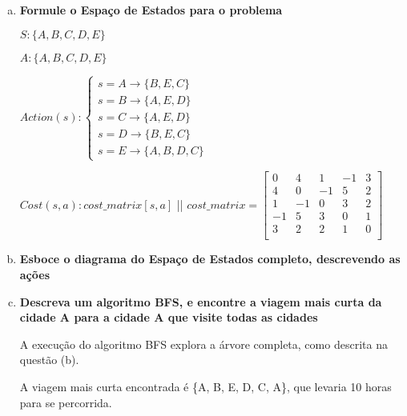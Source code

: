 \documentclass[paper=a4, fontsize=11pt]{scrartcl} %
\begin{document}
    \begin{enumerate}[(a)]
        \item \textbf{Formule o Espaço de Estados para o problema}
        \par $S: \{A, B, C, D, E\}$
        \vspace{0.2cm}

        \par $A: \{A, B, C, D, E\}$
        \vspace{0.2cm}

        \par $Action(s): \begin{cases} 
            s=A \rightarrow \{{B, E, C}\}   \\
            s=B \rightarrow \{{A, E, D}\}   \\
            s=C \rightarrow \{{A, E, D}\}   \\
            s=D \rightarrow \{{B, E, C}\}   \\
            s=E \rightarrow \{{A, B, D, C}\}
            \end{cases}$
        \vspace{0.2cm}

        \par $Cost(s, a): cost\_matrix[s,a]$  ||  $cost\_matrix=
        \begin{bmatrix}
             0 &  4 &  1 & -1 & 3 \\
             4 &  0 & -1 &  5 & 2 \\
             1 & -1 &  0 &  3 & 2 \\
            -1 &  5 &  3 &  0 & 1 \\
             3 &  2 &  2 &  1 & 0 \\
        \end{bmatrix}$
        \vspace{0.2cm}

        \pagebreak
        \item \textbf{Esboce o diagrama do Espaço de Estados completo, descrevendo as ações}
        \par 
        \vspace{0.2cm}

        \item \textbf{Descreva um algoritmo BFS, e encontre a viagem mais curta da cidade A para a cidade A que visite todas as cidades}
        \par A execução do algoritmo BFS explora a árvore completa, como descrita na questão (b).
        \par A viagem mais curta encontrada é \{A, B, E, D, C, A\}, que levaria 10 horas para se percorrida.
        \vspace{0.2cm}


\end{enumerate}
\end{document}
